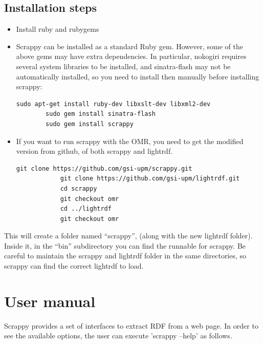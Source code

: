 \subsection{Installation steps}
\begin{itemize}
	\item Install ruby and rubygems
	\item Scrappy can be installed as a standard Ruby gem. However, some of the above gems may have extra dependencies. In particular, nokogiri requires several system libraries to be installed, and sinatra-flash may not be automatically installed, so you need to install then manually before installing scrappy:
	\begin{lstlisting}[style=consola, numbers=none]
		sudo apt-get install ruby-dev libxslt-dev libxml2-dev
		sudo gem install sinatra-flash
		sudo gem install scrappy
	\end{lstlisting}
	
	\item If you want to run scrappy with the OMR, you need to get the modified version from github, of both scrappy and lightrdf.
	
		\begin{lstlisting}[style=consola, numbers=none]
			git clone https://github.com/gsi-upm/scrappy.git
			git clone https://github.com/gsi-upm/lightrdf.git
			cd scrappy
			git checkout omr
			cd ../lightrdf
			git checkout omr
		\end{lstlisting}

	
\end{itemize}

This will create a folder named “scrappy”, (along with the new lightrdf folder). Inside it, in the “bin” subdirectory you can find the runnable for scrappy. Be careful to maintain the scrappy and lightrdf folder in the same directories, so scrappy can find the correct lightrdf to load.

\section{User manual}
\label{sec:scrappyusermanual}
Scrappy provides a set of interfaces to extract RDF from a web page. In order to see the available options, the user can execute 'scrappy –help' as follows.

